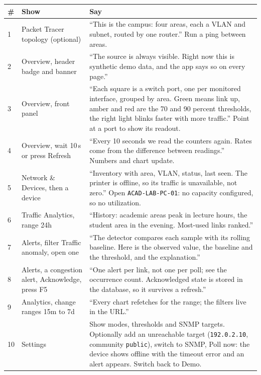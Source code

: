 \documentclass[11pt,a4paper]{article}
\newcommand{\code}[1]{\texttt{#1}}
\begin{document}
\begin{tabularx}{\linewidth}{@{}p{0.4cm} >{\raggedright\arraybackslash}p{3.9cm} Y@{}}
\toprule
\textbf{\#} & \textbf{Show} & \textbf{Say} \\
 & Packet Tracer topology (optional) & ``This is the campus: four areas, each a VLAN and subnet, routed by one router.'' Run a ping between areas. \\
2 & Overview, header badge and banner & ``The source is always visible. Right now this is synthetic demo data, and the app says so on every page.'' \\
3 & Overview, front panel & ``Each square is a switch port, one per monitored interface, grouped by area. Green means link up, amber and red are the 70 and 90 percent thresholds, the right light blinks faster with more traffic.'' Point at a port to show its readout. \\
4 & Overview, wait 10\,s or press Refresh & ``Every 10 seconds we read the counters again. Rates come from the difference between readings.'' Numbers and chart update. \\
5 & Network \& Devices, then a device & ``Inventory with area, VLAN, status, last seen. The printer is offline, so its traffic is unavailable, not zero.'' Open \code{ACAD-LAB-PC-01}: no capacity configured, so no utilization. \\
6 & Traffic Analytics, range 24h & ``History: academic areas peak in lecture hours, the student area in the evening. Most-used links ranked.'' \\
7 & Alerts, filter Traffic anomaly, open one & ``The detector compares each sample with its rolling baseline. Here is the observed value, the baseline and the threshold, and the explanation.'' \\
8 & Alerts, a congestion alert, Acknowledge, press F5 & ``One alert per link, not one per poll; see the occurrence count. Acknowledged state is stored in the database, so it survives a refresh.'' \\
9 & Analytics, change ranges 15m to 7d & ``Every chart refetches for the range; the filters live in the URL.'' \\
10 & Settings & Show modes, thresholds and SNMP targets. Optionally add an unreachable target (\code{192.0.2.10}, community \code{public}), switch to SNMP, Poll now: the device shows offline with the timeout error and an alert appears. Switch back to Demo. \\
\bottomrule
\end{tabularx}
\end{document}
